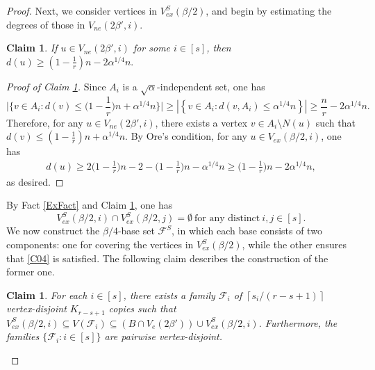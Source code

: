 \documentclass[11pt, a4paper]{article}
\newtheorem{claim}[theorem]{Claim}
\theoremstyle{definition}
\newcommand{\<}{\subseteq}
\begin{document}
\begin{proof}
Next, we consider vertices in $V_{ex}^S(\beta/2)$, and begin by estimating the degrees of those in $V_{ne}(2\beta', i)$.
\begin{claim}\label{degree-V-S}
    If $u\in V_{ne}(2\beta',i)$ for some $i\in [s]$, then $d(u)\geq \left(1-\frac{1}{r}\right)n-2\alpha^{1/4}n.$
\end{claim}
\begin{proof}[Proof of Claim \ref{degree-V-S}]
    Since $A_i$ is a $\sqrt{\alpha}$-independent set, one has 
$$
\Big|\Big\{v\in A_i:d(v)\le \Big(1-\frac{1}{r}\Big)n+\alpha^{1/4} n\Big\}\Big|\geq \left|\left\{v\in A_i:d(v,A_i)\le \alpha^{1/4} n\right\}\right|\geq \frac{n}{r}-2\alpha^{1/4} n. 
$$
Therefore, for any $u\in V_{ne}(2\beta',i)$, there exists a vertex $v\in A_i\setminus N(u)$ such that $d(v)\le (1-\frac{1}{r})n+\alpha^{1/4} n.$ By Ore's condition, for any $u\in V_{ex}(\beta/2,i)$, one has  
\begin{align*}%
    d(u)\ge 2\Big(1-\frac{1}{r}\Big)n-2-\Big(1-\frac{1}{r}\Big)n-\alpha^{1/4} n\ge \Big(1-\frac{1}{r}\Big)n-2\alpha^{1/4}n,
\end{align*} 
as desired.
\end{proof}
By Fact \ref{ExFact} and  Claim \ref{degree-V-S}, one has  $$V_{ex}^S(\beta/2,i)\cap V_{ex}^S(\beta/2,j)=\emptyset\ \text{for any distinct}\ i, j \in [s].$$
We now construct the $\beta/4$-base set $\mathcal{F}^S$, in which each base consists of two components: one for covering the vertices in $V_{ex}^S(\beta/2)$, while the other ensures that \ref{C04} is satisfied. 
The following claim describes the construction of the former one. %


\begin{claim}\label{r-scover}
 For each $i\in [s]$, there exists a family $\mathcal{F}_i$  of $\left\lceil s_i/(r-s+1)\right\rceil$ vertex-disjoint $K_{r-s+1}$ copies such that $V_{ex}^S(\beta/2,i) \subseteq V(\mathcal{F}_i)\subseteq \left(B\cap V_{e}(2\beta')\right)\cup V_{ex}^S(\beta/2,i)$. Furthermore, the families $\{\mathcal{F}_i:i\in [s]\}$ are pairwise vertex-disjoint.


\end{claim}
\end{proof}
\end{document}
